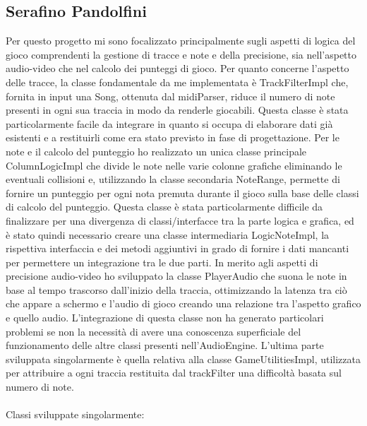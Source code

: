 \documentclass[a4paper,12pt]{report}
\begin{document}
\subsection{Serafino Pandolfini}
Per questo progetto mi sono focalizzato principalmente sugli aspetti di logica del gioco comprendenti la gestione di tracce e note e della precisione,
sia nell’aspetto audio-video che nel calcolo dei punteggi di gioco. Per quanto
concerne l’aspetto delle tracce, la classe fondamentale da me implementata
è TrackFilterImpl che, fornita in input una Song, ottenuta dal midiParser,
riduce il numero di note presenti in ogni sua traccia in modo da renderle giocabili. Questa classe è stata particolarmente facile da integrare in quanto
si occupa di elaborare dati già esistenti e a restituirli come era stato previsto
in fase di progettazione. Per le note e il calcolo del punteggio ho realizzato un
unica classe principale ColumnLogicImpl che divide le note nelle varie colonne
grafiche eliminando le eventuali collisioni e, utilizzando la classe secondaria
NoteRange, permette di fornire un punteggio per ogni nota premuta durante
il gioco sulla base delle classi di calcolo del punteggio. Questa classe è stata particolarmente difficile da
finalizzare per una divergenza di classi/interfacce tra la parte logica e grafica,
ed è stato quindi necessario creare una classe intermediaria LogicNoteImpl, la rispettiva interfaccia e
dei metodi aggiuntivi in grado di fornire i dati mancanti per permettere un
integrazione tra le due parti. In merito agli aspetti di precisione audio-video
ho sviluppato la classe PlayerAudio che suona le note in base al tempo trascorso dall’inizio della traccia, ottimizzando la latenza tra ciò che appare a
schermo e l’audio di gioco creando una relazione tra l’aspetto grafico e quello
audio. L’integrazione di questa classe non ha generato particolari problemi se
non la necessità di avere una conoscenza superficiale del funzionamento delle
altre classi presenti nell’AudioEngine. L’ultima parte sviluppata singolarmente è quella relativa alla classe GameUtilitiesImpl, utilizzata per attribuire a
ogni traccia restituita dal trackFilter una difficoltà basata sul numero di note.
 \\ \\
Classi sviluppate singolarmente:
\end{document}

